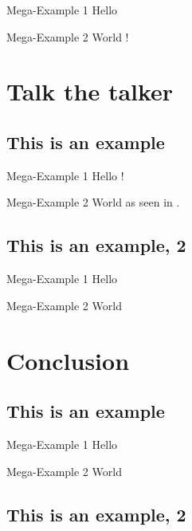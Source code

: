 \documentclass[aspectratio=169,usepdftitle=true]{beamer}
\begin{document}
\begin{frame}{Mega-Example 1}
    Hello
\end{frame}

\begin{frame}{Mega-Example 2}
    World \cite{knuth-web}!
\end{frame}

\section{Talk the talker}
\subsection{This is an example}

\begin{frame}{Mega-Example 1}
    Hello \cite{dirac}!
\end{frame}

\begin{frame}{Mega-Example 2}
    World as seen in \cite{einstein}.
\end{frame}

\subsection{This is an example, 2}

\begin{frame}{Mega-Example 1}
    Hello
\end{frame}

\begin{frame}{Mega-Example 2}
    World
\end{frame}


\section{Conclusion}
\subsection{This is an example}

\begin{frame}{Mega-Example 1}
    Hello
\end{frame}

\begin{frame}{Mega-Example 2}
    World
\end{frame}

\subsection{This is an example, 2}
\end{document}

